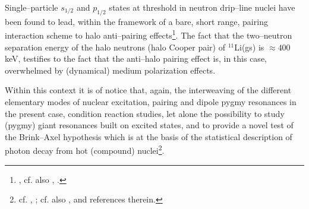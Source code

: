    
   
 Single--particle $s_{1/2}$ and $p_{1/2}$ states at threshold in neutron drip--line nuclei have been found to lead, within the framework of a bare, short range, pairing interaction scheme to halo anti--pairing effects\footnote{\citet{Bennaceur:00}, cf. also \citet{Hamamoto:03}, \citet{Hamamoto:04}.}. The fact that the two--neutron separation energy of the halo neutrons (halo Cooper pair) of $^{11}$Li(gs) is $\approx 400$keV, testifies to the fact that the anti--halo pairing effect is, in this case, overwhelmed by (dynamical) medium polarization effects.
 
 Within this context it is of notice that, again, the interweaving of the different elementary modes of nuclear excitation, pairing and dipole pygmy resonances in the present case, condition reaction studies, let alone the possibility to study (pygmy) giant resonances built on excited states, and to provide a novel test of the Brink--Axel hypothesis which is at the basis of the statistical description of photon decay from hot (compound) nuclei\footnote{cf. \cite{Axel:62}, \citet{Brink:55}; cf. also \citet{Bortignon:98}, \cite{Bertsch:86} and references therein.}. 
 
